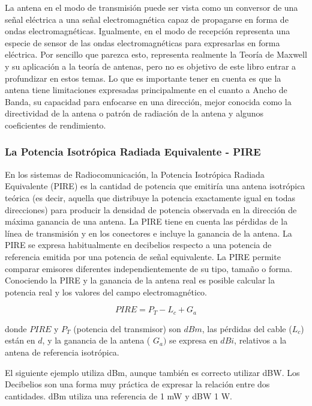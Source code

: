 La antena en el modo de transmisión puede ser vista como un conversor de una señal eléctrica a una señal electromagnética capaz de propagarse en forma de ondas electromagnéticas. Igualmente, en el modo de recepción representa una especie de sensor de las ondas electromagnéticas para expresarlas en forma eléctrica. Por sencillo que parezca esto, representa realmente la Teoría de Maxwell y su aplicación a la teoría de antenas, pero no es objetivo de este libro entrar a profundizar en estos temas. Lo que es importante tener en cuenta es que la antena tiene limitaciones expresadas principalmente en el cuanto a Ancho de Banda, su capacidad para enfocarse en una dirección, mejor conocida como la directividad de la antena o patrón de radiación de la antena y algunos coeficientes de rendimiento.\\

\subsubsection{La Potencia Isotrópica Radiada Equivalente - PIRE}
En los sistemas de Radiocomunicación, la Potencia Isotrópica Radiada Equivalente (PIRE) es la cantidad de potencia que emitiría una antena isotrópica teórica (es decir, aquella que distribuye la potencia exactamente igual en todas direcciones) para producir la densidad de potencia observada en la dirección de máxima ganancia de una antena. La PIRE tiene en cuenta las pérdidas de la línea de transmisión y en los conectores e incluye la ganancia de la antena. La PIRE se expresa habitualmente en decibelios respecto a una potencia de referencia emitida por una potencia de señal equivalente. La PIRE permite comparar emisores diferentes independientemente de su tipo, tamaño o forma. Conociendo la PIRE y la ganancia de la antena real es posible calcular la potencia real y los valores del campo electromagnético.



\begin{equation} \label{equ_pire}
PIRE=P_{T}-L_{c}+G_{a}	 				
\end{equation}

donde $ PIRE $ y $P_{T}$  (potencia del transmisor) son $dBm$, las pérdidas del cable ($L_{c}$) están en $d$, y la ganancia de la antena ( $G_{a})$  se expresa en $dBi$, relativos a la antena de referencia isotrópica.

El siguiente ejemplo utiliza dBm, aunque también es correcto utilizar dBW. Los Decibelios son una forma muy práctica de expresar la relación entre dos cantidades. dBm utiliza una referencia de 1 mW y dBW 1 W.

